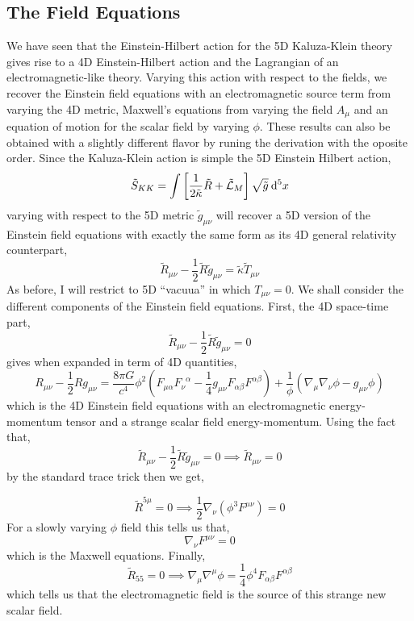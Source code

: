 \documentclass[11pt, a4paper]{article}
\begin{document}
\subsection{The Field Equations}

We have seen that the Einstein-Hilbert action for the 5D Kaluza-Klein theory gives rise to a 4D Einstein-Hilbert action and the Lagrangian of an electromagnetic-like theory. Varying this action with respect to the fields, we recover the Einstein field equations with an electromagnetic source term from varying the 4D metric, Maxwell's equations from varying the field $A_\mu$ and an equation of motion for the scalar field by varying $\phi$. These results can also be obtained with a slightly different flavor by runing the derivation with the oposite order. Since the Kaluza-Klein action is simple the 5D Einstein Hilbert action,  
\[ \tilde{S}_{KK} = \int \left[ \frac{1}{2 \tilde{\kappa}} \tilde{R} + \tilde{\mathcal{L}}_{M} \right] \sqrt{\tilde{g}} \: \mathrm{d}^{5} x \]
varying with respect to the 5D metric $\tilde{g}_{\mu \nu}$ will recover a 5D version of the Einstein field equations with exactly the same form as its 4D general relativity counterpart,
\[ \tilde{R}_{\mu \nu} - \frac{1}{2} \tilde{R} \tilde{g}_{\mu \nu} = \tilde{\kappa} \tilde{T}_{\mu \nu} \]
As before, I will restrict to 5D ``vacuua'' in which $T_{\mu \nu} = 0$. We shall consider the different components of the Einstein field equations. First, the 4D space-time part,
\[ \tilde{R}_{\mu \nu} - \frac{1}{2} \tilde{R} \tilde{g}_{\mu \nu} = 0\]
gives when expanded in term of 4D quantities,
\[ R_{\mu \nu} - \frac{1}{2} R g_{\mu \nu} = \frac{8 \pi G}{c^4} \phi^2 \left(F_{\mu \alpha} {F_{\nu}}^{\alpha} - \frac{1}{4} g_{\mu \nu} F_{\alpha \beta} F^{\alpha \beta} \right) + \frac{1}{\phi} \left( \nabla_\mu \nabla_\nu \phi - g_{\mu \nu} \phi \right) \]
which is the 4D Einstein field equations with an electromagnetic energy-momentum tensor and a strange scalar field energy-momentum. 
Using the fact that,
\[ \tilde{R}_{\mu \nu} - \frac{1}{2} \tilde{R} \tilde{g}_{\mu \nu} = 0 \implies \tilde{R}_{\mu \nu} = 0\] 
by the standard trace trick then we get,

\[ \tilde{R}^{5 \mu} = 0 \implies \frac{1}{2} \nabla_{\nu} \left( \phi^3 F^{\mu \nu} \right) = 0 \]
For a slowly varying $\phi$ field this tells us that,
\[ \nabla_\nu F^{\mu \nu} = 0 \]
which is the Maxwell equations. 
Finally, 
\[ \tilde{R}_{55} = 0 \implies \nabla_\mu \nabla^\mu \phi = \frac{1}{4} \phi^4 F_{\alpha \beta} F^{\alpha \beta} \]
which tells us that the electromagnetic field is the source of this strange new scalar field. 
\end{document}
